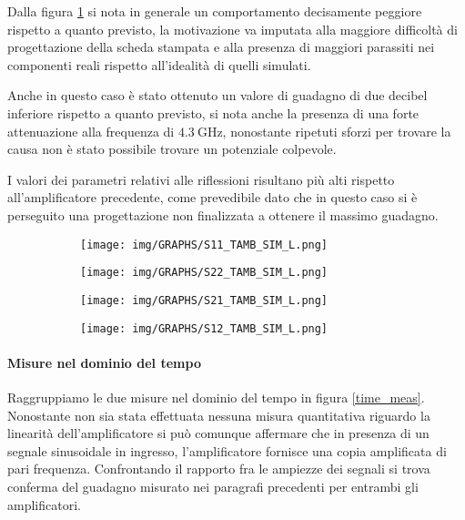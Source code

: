 \documentclass[12pt,oneside]{book}
\begin{document}
Dalla figura \ref{amb_l} si nota in generale un comportamento decisamente peggiore rispetto a quanto previsto, la motivazione va imputata alla maggiore difficoltà di progettazione della scheda stampata e alla presenza di maggiori parassiti nei componenti reali rispetto all'idealità di quelli simulati.

Anche in questo caso è stato ottenuto un valore di guadagno di due decibel inferiore rispetto a quanto previsto, si nota anche la presenza di una forte attenuazione alla frequenza di $\SI{4.3}{\giga\hertz}$, nonostante ripetuti sforzi per trovare la causa non è stato possibile trovare un potenziale colpevole.

I valori dei parametri relativi alle riflessioni risultano più alti rispetto all'amplificatore precedente, come prevedibile dato che in questo caso si è perseguito una progettazione non finalizzata a ottenere il massimo guadagno.

\begin{figure}[!htbp]
    \centering
    \begin{subfigure}[t]{0.48\textwidth}
        \centering
        \texttt{[image: img/GRAPHS/S11\_TAMB\_SIM\_L.png]}
        \caption{}
    \end{subfigure}
    \hfill
    \begin{subfigure}[t]{0.48\textwidth}
        \centering
        \texttt{[image: img/GRAPHS/S22\_TAMB\_SIM\_L.png]}
        \caption{}
    \end{subfigure}
    \hfill
    \centering
    \begin{subfigure}[t]{0.48\textwidth}
        \centering
        \texttt{[image: img/GRAPHS/S21\_TAMB\_SIM\_L.png]}
        \caption{}
    \end{subfigure}
    \hfill
    \begin{subfigure}[t]{0.48\textwidth}
        \centering
        \texttt{[image: img/GRAPHS/S12\_TAMB\_SIM\_L.png]}
        \caption{}
    \end{subfigure}
    \caption{}
    \label{amb_l}
\end{figure}

\paragraph{Misure nel dominio del tempo}

Raggruppiamo le due misure nel dominio del tempo in figura \ref{time_meas}.
Nonostante non sia stata effettuata nessuna misura quantitativa riguardo la linearità dell'amplificatore si può comunque affermare che in presenza di un segnale sinusoidale in ingresso, l'amplificatore fornisce una copia amplificata di pari frequenza. Confrontando il rapporto fra le ampiezze dei segnali si trova conferma del guadagno misurato nei paragrafi precedenti per entrambi gli amplificatori.
\end{document}
